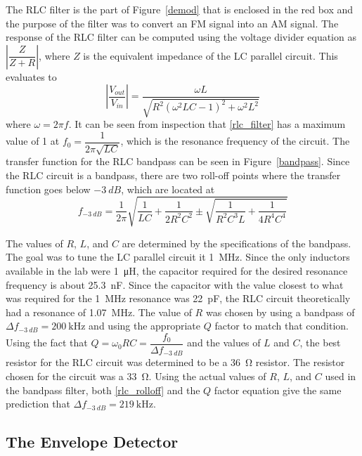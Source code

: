 \documentclass[11pt,letterpaper]{article}
\begin{document}
The RLC filter is the part of Figure~\ref{demod} that is enclosed in the red
box and the purpose of the filter was to convert an FM signal into an AM signal.
The response of the RLC filter can be computed using the voltage divider
equation as $\left|\dfrac{Z}{Z+R}\right|$, where $Z$ is the equivalent
impedance of the LC parallel circuit. This evaluates to
\begin{equation}
    \left|\frac{V_{out}}{V_{in}}\right| = 
    \frac{\omega L}{\sqrt{R^2\left(\omega^2 LC - 1\right)^2 + \omega^2 L^2}}
    \label{rlc_filter}
\end{equation}
where $\omega = 2\pi f$. It can be seen from inspection that \eqref{rlc_filter}
has a maximum value of 1 at $f_0 = \dfrac{1}{2\pi\sqrt{LC}}$, which is the
resonance frequency of the circuit. The transfer function for the RLC bandpass
can be seen in Figure~\ref{bandpass}. Since the RLC circuit is a bandpass, there
are two roll-off points where the transfer function goes below $\SI{-3}{dB}$,
which are located at
\begin{equation}
    f_{\SI{-3}{dB}} = \frac{1}{2\pi}\sqrt{
        \frac{1}{LC} + 
        \frac{1}{2R^2C^2} \pm
        \sqrt{
            \frac{1}{R^2C^3L} + 
            \frac{1}{4R^4C^4}
        }
    }
    \label{rlc_rolloff}
\end{equation}

The values of $R$, $L$, and $C$ are determined by the specifications of the
bandpass. The goal was to tune the LC parallel circuit it \SI{1}{\mega \hertz}.
Since the only inductors available in the lab were \SI{1}{\micro \henry}, the
capacitor required for the desired resonance frequency is about
\SI{25.3}{\nano \farad}. Since the capacitor with the value closest to what was
required for the \SI{1}{\mega\hertz} resonance was \SI{22}{\pico\farad}, the RLC
circuit theoretically had a resonance of \SI{1.07}{\mega\hertz}. The value of
$R$ was chosen by using a bandpass of $\Delta f_{\SI{-3}{dB}} =
\SI{200}{\kilo\hertz}$ and using the appropriate $Q$ factor to match that
condition. Using the fact that
$Q = \omega_0 RC = \dfrac{f_0}{\Delta f_{\SI{-3}{dB}}}$
and the values of $L$ and $C$, the best resistor for the RLC circuit was
determined to be a \SI{36}{\ohm} resistor. The resistor chosen for the circuit
was a \SI{33}{\ohm}. Using the actual values of $R$, $L$, and $C$ used in the
bandpass filter, both \eqref{rlc_rolloff} and the $Q$ factor equation give the
same prediction that $\Delta f_{\SI{-3}{dB}} = \SI{219}{\kilo\hertz}$.

\subsection{The Envelope Detector}
\end{document}
